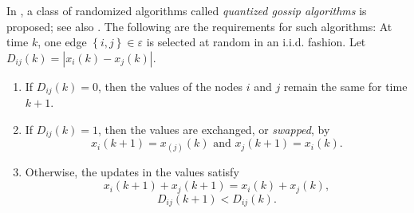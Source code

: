 \documentclass[12pt]{article}
\begin{document}
			In \cite{bib13}, a class of randomized algorithms called \textit{quantized gossip algorithms} is proposed; see also \cite{bib06}. The following are the requirements for such algorithms: At time $k$, one edge  $\left\{ i, j \right\} \in \varepsilon$  is selected at random in an i.i.d. fashion. Let  $D_{ij}(k)=\left| x_{i}(k)-x_{j}(k) \right|$.  
			\begin{enumerate}[label=(\alph*)] 	
				\item If $D_{ij}(k)=0$, then the values of the nodes $i$ and $j$ remain the same for time $k+1$. \item If $D_{ij}(k)=1$, then the values are exchanged, or \textit{swapped}, by 	
				\begin{equation} 		
					x_{i}(k+1)=x_(j)(k) \text{ and } x_{j}(k+1)=x_{i}(k). 	
				\end{equation} 	
				\item Otherwise, the updates in the values satisfy 	
				\begin{equation*} 		
					x_{i}(k+1)+x_{j}(k+1)=x_{i}(k)+x_{j}(k), 	
				\end{equation*} 	
				\begin{equation*} 		
					D_{ij}(k+1)< D_{ij}(k). 	
				\end{equation*} 
			\end{enumerate} 
\end{document}

